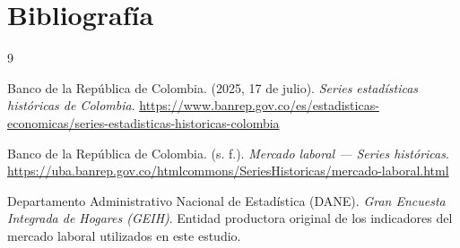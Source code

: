 \documentclass[11pt,a4paper]{article}
\begin{document}
\newpage
\section{Bibliografía}

\begin{thebibliography}{9}

Banco de la República de Colombia. (2025, 17 de julio). \textit{Series estadísticas históricas de Colombia}. \url{https://www.banrep.gov.co/es/estadisticas-economicas/series-estadisticas-historicas-colombia}

Banco de la República de Colombia. (s. f.). \textit{Mercado laboral — Series históricas}. \url{https://uba.banrep.gov.co/htmlcommons/SeriesHistoricas/mercado-laboral.html}

Departamento Administrativo Nacional de Estadística (DANE). \textit{Gran Encuesta Integrada de Hogares (GEIH)}. Entidad productora original de los indicadores del mercado laboral utilizados en este estudio.

\end{thebibliography}
\end{document}
